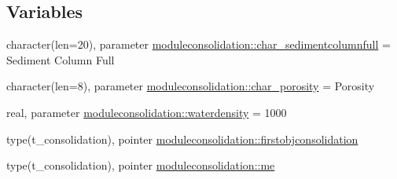 \subsection*{Variables}
\begin{DoxyCompactItemize}
\item 
character(len=20), parameter \mbox{\hyperlink{namespacemoduleconsolidation_a2a32335f2940d1ba0a8488797e504295}{moduleconsolidation\+::char\+\_\+sedimentcolumnfull}} = \textquotesingle{}Sediment Column Full\textquotesingle{}
\item 
character(len=8), parameter \mbox{\hyperlink{namespacemoduleconsolidation_a5c123194ad718ebaf0fe7466ca4d7c82}{moduleconsolidation\+::char\+\_\+porosity}} = \textquotesingle{}Porosity\textquotesingle{}
\item 
real, parameter \mbox{\hyperlink{namespacemoduleconsolidation_ae2d4a16a8d18816c8bb53007d7ec0634}{moduleconsolidation\+::waterdensity}} = 1000
\item 
type(t\+\_\+consolidation), pointer \mbox{\hyperlink{namespacemoduleconsolidation_abf614f867a201723e44b18315fa3223d}{moduleconsolidation\+::firstobjconsolidation}}
\item 
type(t\+\_\+consolidation), pointer \mbox{\hyperlink{namespacemoduleconsolidation_a6a9ef6cb5eb83e8fa553110a7afca22b}{moduleconsolidation\+::me}}
\end{DoxyCompactItemize}
